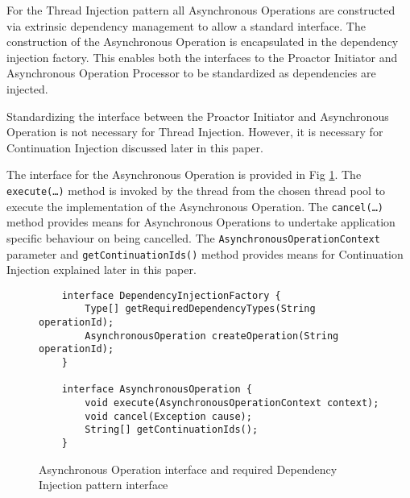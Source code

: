 \documentclass[prodmode]{style/acmlarge}
\begin{document}
For the Thread Injection pattern all Asynchronous Operations are constructed via
extrinsic dependency management \cite{ioc} to allow a standard interface.
The construction of the Asynchronous Operation is encapsulated in the dependency
injection factory.  This enables both the interfaces to the Proactor Initiator
and Asynchronous Operation Processor to be standardized as dependencies are
injected.

Standardizing the interface between the Proactor Initiator and Asynchronous
Operation is not necessary for Thread Injection.  However, it is necessary for
Continuation Injection discussed later in this paper.

The interface for the Asynchronous Operation is provided in Fig
\ref{fig:AO_interface_AOP}.  The \texttt{execute(\ldots)} method is invoked by
the thread from the chosen thread pool to execute the implementation of the
Asynchronous Operation.  The \texttt{cancel(\ldots)} method provides means for
Asynchronous Operations to undertake application specific behaviour on being
cancelled.  The \texttt{AsynchronousOperationContext} parameter and
\texttt{getContinuationIds()} method provides means for Continuation Injection
explained later in this paper.

\begin{figure}[tp]
\centering
\begin{verbatim}
    interface DependencyInjectionFactory {
        Type[] getRequiredDependencyTypes(String operationId);
        AsynchronousOperation createOperation(String operationId);
    }

    interface AsynchronousOperation {
        void execute(AsynchronousOperationContext context);
        void cancel(Exception cause);
        String[] getContinuationIds();
    }
\end{verbatim}
\caption{Asynchronous Operation interface and required Dependency Injection pattern interface\footnotemark}
\label{fig:AO_interface_AOP}
\end{figure}
\end{document}
